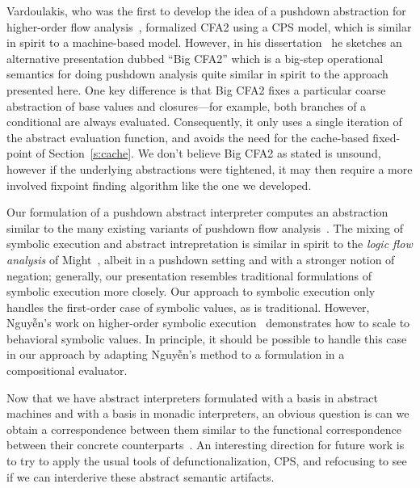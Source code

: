 Vardoulakis, who was the first to develop the idea of a pushdown abstraction
for higher-order flow analysis~\cite{dvanhorn:Vardoulakis2011CFA2}, formalized
CFA2 using a CPS model, which is similar in spirit to a machine-based model.
However, in his dissertation~\cite{local:vardoulakis-diss12} he sketches an
alternative presentation dubbed ``Big CFA2'' which is a big-step operational
semantics for doing pushdown analysis quite similar in spirit to the approach
presented here.  One key difference is that Big CFA2 fixes a particular coarse
abstraction of base values and closures---for example, both branches of a
conditional are always evaluated.  Consequently, it only uses a single
iteration of the abstract evaluation function, and avoids the need for the
cache-based fixed-point of Section~\ref{s:cache}.  We don't believe Big CFA2 as
stated is unsound, however if the underlying abstractions were tightened, it
may then require a more involved fixpoint finding algorithm like the one we
developed.

Our formulation of a pushdown abstract interpreter computes an abstraction
similar to the many existing variants of pushdown flow analysis~\cite%
{dvanhorn:Vardoulakis2011CFA2%
,dvanhorn:Earl2010Pushdown%
,local:vardoulakis-diss12%
,dvanhorn:VanHorn2012Systematic%
,dvanhorn:Earl2012Introspective%
,dvanhorn:Johnson2014Abstracting%
,dvanhorn:Johnson2014Pushdown%
,local:p4f%
}.
The mixing of symbolic execution and abstract intrepretation is similar in
spirit to the \emph{logic flow analysis} of Might~\cite{local:might-popl07},
albeit in a pushdown setting and with a stronger notion of negation; generally,
our presentation resembles traditional formulations of symbolic execution more
closely.  Our approach to symbolic execution only handles the first-order case
of symbolic values, as is traditional.  However, Nguyễn's work on higher-order
symbolic execution~\cite{dvanhorn:Nguyen2015Relatively} demonstrates how to
scale to behavioral symbolic values.  In principle, it should be possible to
handle this case in our approach by adapting Nguyễn's method to a formulation
in a compositional evaluator.

Now that we have abstract interpreters formulated with a basis in abstract
machines and with a basis in monadic interpreters, an obvious question is can
we obtain a correspondence between them similar to the functional
correspondence between their concrete
counterparts~\cite{dvanhorn:Ager2005Functional}.  An interesting direction for
future work is to try to apply the usual tools of defunctionalization, CPS, and
refocusing to see if we can interderive these abstract semantic artifacts.
